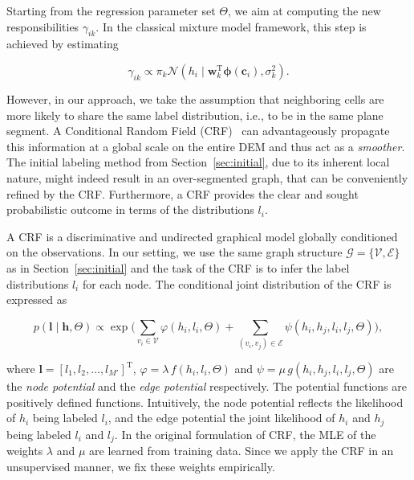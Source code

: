 Starting from the regression parameter set $\Theta$, we aim at computing the new
responsibilities $\gamma_{ik}$. In the classical mixture model framework, this
step is achieved by estimating

\begin{equation}
\label{eqn:responsibilities}
\gamma_{ik}\propto \pi_k\mathcal{N}(h_i\mid\mathbf{w}_k^\text{T}
\boldsymbol{\phi}(\mathbf{c}_i),\sigma^2_k).
\end{equation}

However, in our approach, we take the assumption that neighboring cells are more
likely to share the same label distribution, i.e., to be in the same plane
segment. A Conditional Random Field (CRF)~\cite{lafferty01conditional}
can advantageously propagate this information at a global scale on the entire
DEM and thus act as a \emph{smoother}. The initial labeling method from
Section~\ref{sec:initial}, due to its inherent local nature, might indeed result
in an over-segmented graph, that can be conveniently refined by the CRF.
Furthermore, a CRF provides the clear and sought probabilistic outcome in terms
of the distributions $l_i$.

A CRF is a discriminative and undirected graphical model globally conditioned on
the observations. In our setting, we use the same graph structure
$\mathcal{G}=\{\mathcal{V},\mathcal{E}\}$ as in Section~\ref{sec:initial} and
the task of the CRF is to infer the label distributions $l_i$ for each node. The
conditional joint distribution of the CRF is expressed as

\begin{equation}
\label{eqn:crf_joint}
p(\mathbf{l}\mid\mathbf{h},\Theta)\propto\exp\bigg(\sum_{v_i\in\mathcal{V}}
\varphi(h_i,l_i,\Theta)+\sum_{(v_i,v_j)\in\mathcal{E}}
\psi(h_i,h_j,l_i,l_j,\Theta)\bigg),
\end{equation}

where $\mathbf{l}=[l_1,l_2,\dots,l_{M'}]^\text{T}$, $\varphi=
\lambda\,f(h_i,l_i,\Theta)$ and $\psi=\mu\,g(h_i,h_j,l_i,l_j,\Theta)$ are the
\emph{node potential} and the \emph{edge potential} respectively. The potential
functions are positively defined functions. Intuitively, the node potential
reflects the likelihood of $h_i$ being labeled $l_i$, and the edge potential the
joint likelihood of $h_i$ and $h_j$ being labeled $l_i$ and $l_j$. In the
original formulation of CRF, the MLE of the weights $\lambda$ and $\mu$ are
learned from training data. Since we apply the CRF in an unsupervised manner, we
fix these weights empirically.

